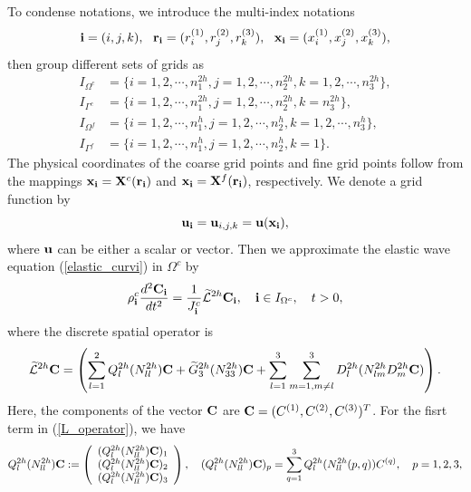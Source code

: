  To condense notations, we introduce the multi-index notations
\[{\bf i} = (i,j,k),\ \ {\bf r}_{\bf i} = (r^{(1)}_i,r^{(2)}_j,r^{(3)}_k),\ \ {\bf x}_{\bf i} = (x^{(1)}_i,x^{(2)}_j,x^{(3)}_k),\]
then group different sets of grids as
\begin{equation*}
\begin{aligned}
	I_{\Omega^c} &= \{i = 1,2,\cdots,n_1^{2h}, j = 1,2,\cdots,n_2^{2h}, k = 1,2,\cdots,n_3^{2h}\},\\
	I_{\Gamma^c} & = \{i = 1,2,\cdots,n_1^{2h}, j = 1,2,\cdots,n_2^{2h}, k = n_3^{2h}\},\\
	I_{\Omega^f} &= \{i = 1,2,\cdots,n_1^h, j = 1,2,\cdots,n_2^h, k = 1,2,\cdots,n_3^h\},\\
	I_{\Gamma^f} & = \{i = 1,2,\cdots,n_1^{h}, j = 1,2,\cdots,n_2^{h}, k = 1\}.
\end{aligned}	
\end{equation*}
The physical coordinates of the coarse grid points and fine grid points follow from the mappings ${\bf x}_{\bf i} = {\bf X}^c({\bf r}_{\bf i})$ and ${\bf x}_{\bf i} = {\bf X}^f({\bf r}_{\bf i})$, respectively. We denote a grid function by
\[{\bf u}_{\bf i} = {\bf u}_{i,j,k} = {\bf u}({\bf x}_{\bf i}),\]
where ${\bf u}$ can be either a scalar or vector. Then we approximate the elastic wave equation (\ref{elastic_curvi}) in $\Omega^c$ by
\begin{equation}\label{elastic_semi_c}
{\rho}_{\bf i}^{c}\frac{d^2{{\bf C}_{\bf i}}}{dt^2} = \frac{1}{J^c_{\bf i}}\wt{\mathcal{L}}^{2h} {{\bf C}}_{\bf i},\quad {\bf i}\in I_{\Omega^c},\quad t>0,
\end{equation}
where the discrete spatial operator is
\begin{equation}\label{L_operator}
\wt{\mathcal{L}}^{2h} {{\bf C}} = \left(\sum_{l=1}^2{Q}_l^{2h}({N}_{ll}^{2h}){\bf C}+\wt{{G}}_3^{2h}({N}_{33}^{2h}){{\bf C}}+\sum_{l=1}^3\sum_{m=1,m\neq l}^3{D}_l^{2h}({N}_{lm}^{2h}{D}_m^{2h}{\bf C})\right).
\end{equation}
Here, the components of the vector ${\bf C}$ are ${\bf C} = (C^{(1)}, C^{(2)}, C^{(3)})^T$. For the fisrt term in (\ref{L_operator}), we have
\begin{align*}
{Q}_l^{2h}({N}_{ll}^{2h}){\bf C} := \left(\begin{array}{c}
({Q}_l^{2h}({N}_{ll}^{2h}){\bf C})_1 \\
({Q}_l^{2h}({N}_{ll}^{2h}){\bf C})_2 \\
({Q}_l^{2h}({N}_{ll}^{2h}){\bf C})_3 
\end{array}\right), \quad ({Q}_l^{2h}({N}_{ll}^{2h}){\bf C})_p = \sum_{q = 1}^{3} Q_l^{2h}(N_{ll}^{2h}(p,q)) {C}^{(q)},\quad p = 1,2,3,
\end{align*}
